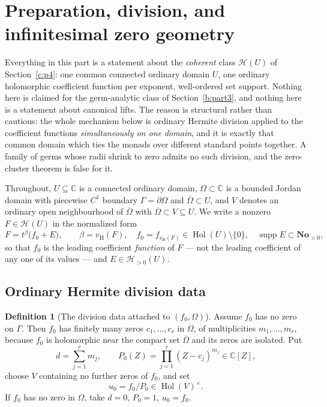 \documentclass[11pt,a4paper]{article}
\numberwithin{equation}{section}
\theoremstyle{definition}
\newtheorem{definition}[theorem]{Definition}
\theoremstyle{remark}
\theoremstyle{plain}
\newcommand{\No}{\mathbf{No}}
\newcommand{\CC}{\mathbb C}
\DeclareMathOperator{\Hol}{Hol}
\DeclareMathOperator{\supp}{supp}
\newcommand{\tm}{t}
\newcommand{\Hc}{\mathcal H}
\newcommand{\vH}{v_{\mathrm H}}
\begin{document}
\section{Preparation, division, and infinitesimal zero geometry}
\label{d:sec:preparation}

Everything in this part is a statement about the \emph{coherent} class
$\Hc(U)$ of Section~\ref{c:p4}: one common connected ordinary domain $U$, one
ordinary holomorphic coefficient function per exponent, well-ordered
set support.  Nothing here is claimed for the germ-analytic class of
Section~\ref{b:part3}, and nothing here is a statement about canonical lifts.  The
reason is structural rather than cautious: the whole mechanism below is
ordinary Hermite division applied to the coefficient functions
\emph{simultaneously on one domain}, and it is exactly that common
domain which ties the monads over different standard points together.
A family of germs whose radii shrink to zero admits no such division,
and the zero-cluster theorem is false for it.

Throughout, $U\subseteq\CC$ is a connected ordinary domain,
$\Omega\subset\CC$ is a bounded Jordan domain with piecewise $C^1$
boundary $\Gamma=\partial\Omega$ and $\overline\Omega\subset U$, and $V$
denotes an ordinary open neighbourhood of $\overline\Omega$ with
$\overline\Omega\subset V\subseteq U$.  We write a nonzero
$F\in\Hc(U)$ in the normalized form
\begin{equation}\label{d:eq:normalform}
 F=\tm^{\beta}\bigl(f_0+E\bigr),
 \qquad \beta=\vH(F),\quad f_0=f_{\vH(F)}\in\Hol(U)\setminus\{0\},
 \quad \supp E\subset\No_{>0},
\end{equation}
so that $f_0$ is the leading coefficient \emph{function} of $F$ --- not
the leading coefficient of any one of its values --- and $E\in
\Hc_{>0}(U)$.

\subsection{Ordinary Hermite division data}
\label{d:sub:hermite}

\begin{definition}[The division data attached to $(f_0,\Omega)$]
\label{d:def:divisiondata}
Assume $f_0$ has no zero on $\Gamma$.  Then $f_0$ has finitely many
zeros $c_1,\dots,c_r$ in $\Omega$, of multiplicities
$m_1,\dots,m_r$, because $f_0$ is holomorphic near the compact set
$\overline\Omega$ and its zeros are isolated.  Put
\[
 d=\sum_{j=1}^{r}m_j,\qquad
 P_0(Z)=\prod_{j=1}^{r}(Z-c_j)^{m_j}\in\CC[Z],
\]
choose $V$ containing no further zeros of $f_0$, and set
\[
 u_0=f_0/P_0\in\Hol(V)^{\times}.
\]
If $f_0$ has no zero in $\Omega$, take $d=0$, $P_0=1$, $u_0=f_0$.
\end{definition}
\end{document}
